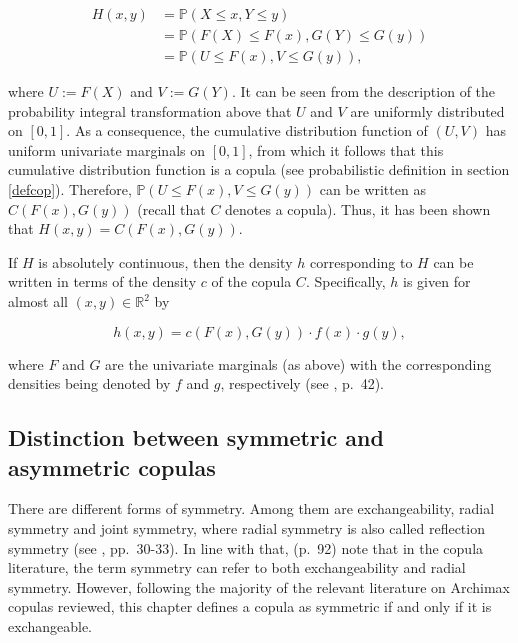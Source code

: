 \documentclass[
]{krantz}
\begin{document}
\begin{equation*}
\begin{split}
H(x,y) 
&= \mathbb{P}(X \leq x, Y \leq y) \\
&= \mathbb{P}(F(X) \leq F(x), G(Y) \leq G(y)) \\
&= \mathbb{P}(U \leq F(x), V \leq G(y)),
\end{split}
\end{equation*}

where \(U := F(X)\) and \(V := G(Y)\).
It can be seen from the description of the probability integral transformation above that \(U\) and \(V\) are uniformly distributed on \([0,1]\). As a consequence, the cumulative distribution function of \((U,V)\) has uniform univariate marginals on \([0,1]\), from which it follows that this cumulative distribution function is a copula (see probabilistic definition in section \ref{defcop}). Therefore, \(\mathbb{P}(U \leq F(x), V \leq G(y))\) can be written as \(C(F(x), G(y))\) (recall that \(C\) denotes a copula). Thus, it has been shown that \(H(x,y)=C(F(x), G(y))\).

If \(H\) is absolutely continuous, then the density \(h\) corresponding to \(H\) can be written in terms of the density \(c\) of the copula \(C\). Specifically, \(h\) is given for almost all \((x,y) \in \mathbb{R}^2\) by

\begin{equation}
h(x, y)=c(F(x), G(y)) \cdot f(x) \cdot g(y),
\label{eq:sklardens}
\end{equation}

where \(F\) and \(G\) are the univariate marginals (as above) with the corresponding densities being denoted by \(f\) and \(g\), respectively (see \citet{durante2016}, p.~42).

\subsection{Distinction between symmetric and asymmetric copulas}\label{asymVsSym}

There are different forms of symmetry. Among them are exchangeability, radial symmetry and joint symmetry, where radial symmetry is also called reflection symmetry (see \citet{durante2016}, pp.~30-33). In line with that, \citet{genest2013} (p.~92) note that in the copula literature, the term symmetry can refer to both exchangeability and radial symmetry. However, following the majority of the relevant literature on Archimax copulas reviewed, this chapter defines a copula as symmetric if and only if it is exchangeable.
\end{document}
